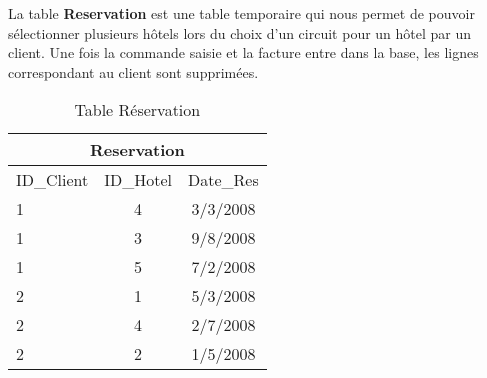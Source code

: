 
\begin{table}[h]
La table \textbf{Reservation} est une table temporaire qui nous permet de pouvoir s\'electionner plusieurs h\^otels lors du choix d'un circuit pour un h\^otel par un client. Une fois la commande saisie et la facture entre dans la base, les lignes correspondant au client sont supprim\'ees.
\begin{center}
\begin{tabular}{|l|c|c|}
\hline
\multicolumn{3}{|c|}{Reservation}\\
\hline
ID\_Client& ID\_Hotel&Date\_Res\\
\hline
1 & 4&3/3/2008\\
\hline
1 & 3&9/8/2008\\
\hline
1 & 5&7/2/2008\\
\hline
2 & 1&5/3/2008\\
\hline
2&4&2/7/2008\\
\hline
2 & 2&1/5/2008\\
\hline
\end{tabular}
\end{center}
\caption{Table R\'eservation}
\end{table}




